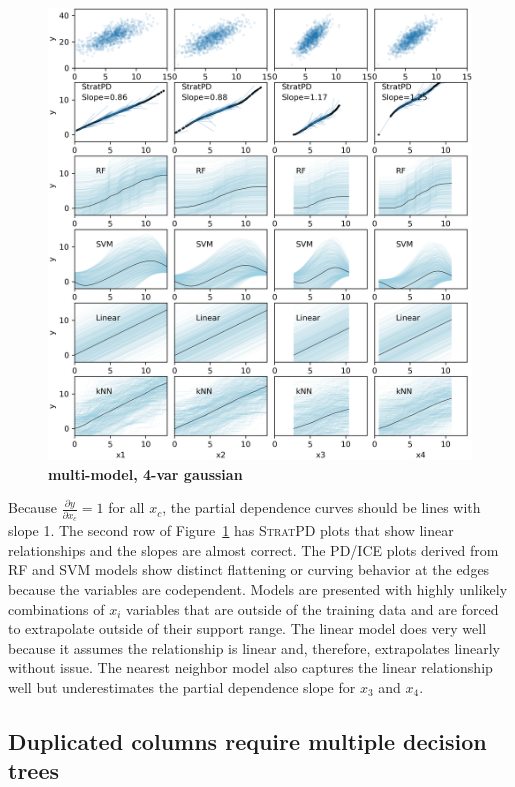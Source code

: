 \documentclass[12pt]{article}
\newcommand{\figref}[1]{Figure~\ref{#1}}
\newcommand{\spd}{\fontfamily{cmr}\textsc{\small StratPD}}
\begin{document}
\begin{figure}[htbp]
\begin{center}
\includegraphics[scale=0.6]{images/multivar_multimodel_normal.png}
\caption{{\bf  multi-model, 4-var gaussian}}
\label{fig:4var}
\end{center}
\end{figure}

Because $\frac{\partial y}{\partial x_{c}} = 1$ for all $x_c$, the partial dependence curves should be lines with slope 1.  The second row of \figref{fig:4var} has \spd{} plots that show linear relationships and the slopes are almost correct.  The PD/ICE plots derived from RF and SVM models show distinct flattening or curving behavior at the edges because the variables are codependent. Models are presented with highly unlikely combinations of $x_i$ variables that are outside of the training data and are forced to extrapolate outside of their support range.  The linear model does very well because it assumes the relationship is linear and, therefore, extrapolates linearly without issue. The nearest neighbor model also captures the linear relationship well but underestimates the partial dependence slope for $x_3$ and $x_4$.
 
\subsection{Duplicated columns require multiple decision trees}\label{sec:dup}
\end{document}
